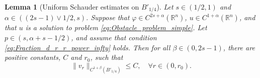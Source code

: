 \documentclass[11pt,reqno]{amsart}
\newtheorem{lem}[thm]{Lemma}
\theoremstyle{definition}
\theoremstyle{remark}
\begin{document}
\begin{lem}[Uniform Schauder estimates on $B'_{1/4}$]
\label{lem:Uniform_boundedness_C_1_alpha_n_ball_rescalings}
Let $s\in (1/2,1)$ and $\alpha\in ((2s-1)\vee 1/2, s)$. Suppose that $\varphi\in C^{2s+\alpha}({\mathbb{R}}^n)$, $u\in C^{1+\alpha}({\mathbb{R}}^n)$, and that $u$ is a solution to problem \eqref{eq:Obstacle_problem_simple}. Let $p \in (s,\alpha+s-1/2)$, and assume that condition \eqref{eq:Fraction_d_r_r_power_infty} holds. Then for all $\beta \in (0,2s-1)$, there are positive constants, $C$ and $r_0$, such that
\begin{equation}
\label{eq:Uniform_boundedness_C_1_alpha_n_ball_rescalings}
\|v_r\|_{C^{1+\beta}(B'_{1/4})} \leq C,\quad\forall r\in (0,r_0).
\end{equation}
\end{lem} 
\end{document}
